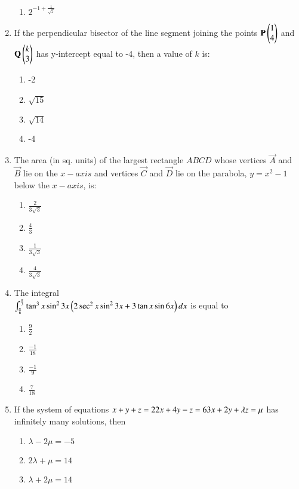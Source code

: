 \documentclass[journal]{IEEEtran}
\begin{document}
\begin{enumerate}
\begin{enumerate}
			\item $2^{-1 + \frac{1}{\sqrt{2}}}$
		\end{enumerate}
	\item
	If the perpendicular bisector of the line segment joining the points $\mathbf{P}\begin{pmatrix}1 \\ 4\end{pmatrix}$ and $\mathbf{Q}\begin{pmatrix}k \\ 3\end{pmatrix}$ has y-intercept equal to -4, then a value of $k$ is:
		\begin{enumerate}
			\item -2
			\item $\sqrt{15}$
			\item $\sqrt{14}$
			\item -4
		\end{enumerate}
	\item
	The area (in sq. units) of the largest rectangle $ABCD$ whose vertices $\vec{A}$ and $\vec{B}$ lie on the $x-axis$ and vertices $\vec{C}$ and $\vec{D}$ lie on the parabola, $y = x^{2}-1$ below 			the $x-axis$, is:
		\begin{enumerate}
			\item $\frac{2}{3\sqrt{3}}$
			\item $\frac{4}{3}$
			\item $\frac{1}{3\sqrt{3}}$
			\item $\frac{4}{3\sqrt{3}}$
		\end{enumerate}
	\item
	The integral \\
	$\int_{\frac{\pi}{6}}^{\frac{\pi}{3}} \tan^{3}{x}\sin^{2}{3x}\left(2\sec^{2}{x}\sin^{2}{3x} + 3\tan{x}\sin{6x}\right) dx$ is equal to 
		\begin{enumerate}
			\item $\frac{9}{2}$
			\item $\frac{-1}{18}$
			\item $\frac{-1}{9}$
			\item $\frac{7}{18}$
		\end{enumerate}
	\item
	If the system of equations
	$
	x + y + z = 2 \\
	2x + 4y - z = 6 \\
	3x + 2y + \lambda z =\mu \\
	$
	has infinitely many solutions, then
		\begin{enumerate}
			\item $\lambda - 2\mu = -5$
			\item $2\lambda + \mu = 14$
			\item $\lambda + 2\mu = 14$

\end{enumerate}
\end{enumerate}
\end{document}
